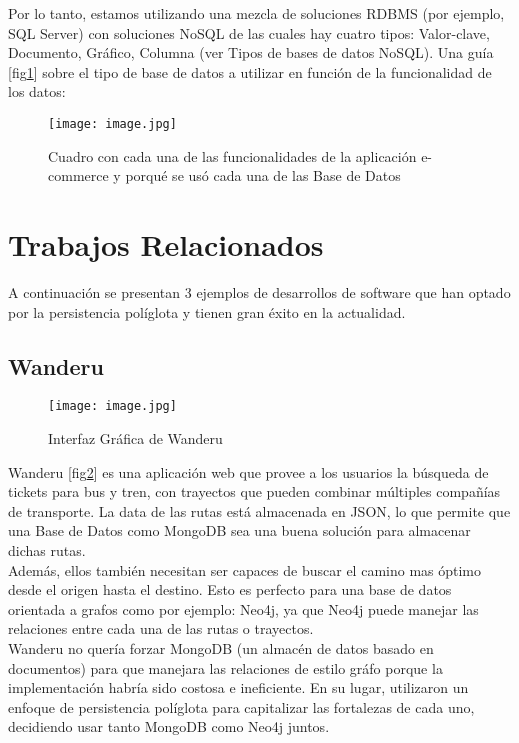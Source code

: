 \documentclass[conference,compsoc]{IEEEtran}
\begin{document}
Por lo tanto, estamos utilizando una mezcla de soluciones RDBMS (por ejemplo, SQL Server) con soluciones NoSQL de las cuales hay cuatro tipos: Valor-clave, Documento, Gráfico, Columna (ver Tipos de bases de datos NoSQL). Una guía [fig\ref{e-commerce}] sobre el tipo de base de datos a utilizar en función de la funcionalidad de los datos:
\\
\begin{figure}[!h]
\centering
\texttt{[image: image.jpg]}
\caption{Cuadro con cada una de las funcionalidades de la aplicación e-commerce y porqué se usó cada una de las Base de Datos}
\label{e-commerce}
\end{figure}

\section{Trabajos Relacionados}
A continuación se presentan 3 ejemplos de  desarrollos de software que han optado por la persistencia políglota y tienen gran éxito en la actualidad.

\subsection{Wanderu}

\begin{figure}[!h]
\centering
\texttt{[image: image.jpg]}
\caption{Interfaz Gráfica de Wanderu}
\label{wanderu}
\end{figure}

Wanderu [fig\ref{wanderu}] es una aplicación web que provee a los usuarios la búsqueda de tickets para bus y tren, con trayectos que pueden combinar múltiples compañías de transporte. La data de las rutas está almacenada en JSON, lo que permite que una Base de Datos como MongoDB sea una buena solución para almacenar dichas rutas.
\\
Además, ellos también necesitan ser capaces de buscar el camino mas óptimo desde el origen hasta el destino. Esto es perfecto para una base de datos orientada a grafos como por ejemplo: Neo4j, ya que Neo4j puede manejar las relaciones entre cada una de las rutas o trayectos.
\\
Wanderu no quería forzar MongoDB (un almacén de datos basado en documentos) para que manejara las relaciones de estilo gráfo porque la implementación habría sido costosa e ineficiente. En su lugar, utilizaron un enfoque de persistencia políglota para capitalizar las fortalezas de cada uno, decidiendo usar tanto MongoDB como Neo4j juntos.\cite{art7}
\end{document}
